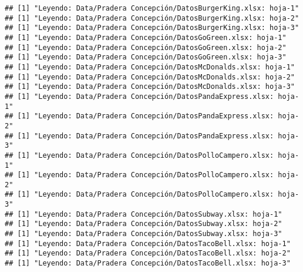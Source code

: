 \documentclass[]{article}
\begin{document}
\begin{verbatim}
## [1] "Leyendo: Data/Pradera Concepción/DatosBurgerKing.xlsx: hoja-1"
## [1] "Leyendo: Data/Pradera Concepción/DatosBurgerKing.xlsx: hoja-2"
## [1] "Leyendo: Data/Pradera Concepción/DatosBurgerKing.xlsx: hoja-3"
## [1] "Leyendo: Data/Pradera Concepción/DatosGoGreen.xlsx: hoja-1"
## [1] "Leyendo: Data/Pradera Concepción/DatosGoGreen.xlsx: hoja-2"
## [1] "Leyendo: Data/Pradera Concepción/DatosGoGreen.xlsx: hoja-3"
## [1] "Leyendo: Data/Pradera Concepción/DatosMcDonalds.xlsx: hoja-1"
## [1] "Leyendo: Data/Pradera Concepción/DatosMcDonalds.xlsx: hoja-2"
## [1] "Leyendo: Data/Pradera Concepción/DatosMcDonalds.xlsx: hoja-3"
## [1] "Leyendo: Data/Pradera Concepción/DatosPandaExpress.xlsx: hoja-1"
## [1] "Leyendo: Data/Pradera Concepción/DatosPandaExpress.xlsx: hoja-2"
## [1] "Leyendo: Data/Pradera Concepción/DatosPandaExpress.xlsx: hoja-3"
## [1] "Leyendo: Data/Pradera Concepción/DatosPolloCampero.xlsx: hoja-1"
## [1] "Leyendo: Data/Pradera Concepción/DatosPolloCampero.xlsx: hoja-2"
## [1] "Leyendo: Data/Pradera Concepción/DatosPolloCampero.xlsx: hoja-3"
## [1] "Leyendo: Data/Pradera Concepción/DatosSubway.xlsx: hoja-1"
## [1] "Leyendo: Data/Pradera Concepción/DatosSubway.xlsx: hoja-2"
## [1] "Leyendo: Data/Pradera Concepción/DatosSubway.xlsx: hoja-3"
## [1] "Leyendo: Data/Pradera Concepción/DatosTacoBell.xlsx: hoja-1"
## [1] "Leyendo: Data/Pradera Concepción/DatosTacoBell.xlsx: hoja-2"
## [1] "Leyendo: Data/Pradera Concepción/DatosTacoBell.xlsx: hoja-3"
\end{verbatim}
\end{document}
